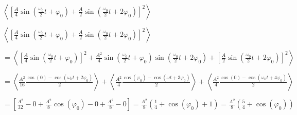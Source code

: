 

\begin{enonce}
$\left<\left[\frac{A}{4}\sin\left(\frac{\omega_0}{2} t + \varphi_0\right) + \frac{A}{2}\sin\left(\frac{\omega_0}{2} t + 2\varphi_0\right)\right]^2\right>$
\end{enonce}
			
			
\begin{corrige}
	$\left<\left[\frac{A}{4}\sin\left(\frac{\omega_0}{2} t + \varphi_0\right) + \frac{A}{2}\sin\left(\frac{\omega_0}{2} t + 2\varphi_0\right)\right]^2\right>$
	
	$=\left<\left[\frac{A}{4}\sin(\frac{\omega_0}{2} t + \varphi_0)\right]^2 + \frac{A^2}{4} \sin(\frac{\omega_0}{2} t + \varphi_0) \sin(\frac{\omega_0}{2} t + 2\varphi_0) + \left[\frac{A}{2} \sin(\frac{\omega_0}{2} t + 2\varphi_0)\right]^2 \right>$

	$=\left<\frac{A^2}{16} \frac{\cos(0)-\cos(\omega_0 t + 2\varphi_0)}{2}\right> + \left< \frac{A^2}{4} \frac{\cos(\varphi_0)-\cos(\omega t +3\varphi_0)}{2}\right> + \left<\frac{A^2}{4} \frac{\cos(0)-\cos(\omega_0 t + 4\varphi_0)}{2}\right>$

	$=\left[\frac{A^2}{32}-0+\frac{A^2}{8}\cos(\varphi_0)-0+\frac{A^2}{8}-0 \right]=\frac{A^2}{8} \left(\frac{1}{4}+\cos(\varphi_0)+1\right)=\frac{A^2}{8} \left(\frac{5}{4}+\cos(\varphi_0)\right)$
\end{corrige}
		

\finEntrainement


\clearpage




\hauteurLargeurCadreReponse		{6mm}{5cm}
\initialisationEntrainement


